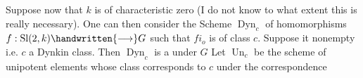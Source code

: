 Suppose now that $k$ is of characteristic zero (I do not know to what extent this is really necessary). One can then consider the Scheme $\operatorname{Dyn}_c$ of homomorphisms $f:\operatorname{Sl}(2,k)\handwritten{\longrightarrow}G$ such that $fi_o$ is of class $c$. Suppose it nonempty i.e. $c$ a Dynkin class. Then $\operatorname{Dyn}_c$ is a  under $G$ Let $\operatorname{Un}_c$ be the scheme of unipotent elements whose class corresponds to  $c$ under the correspondence
